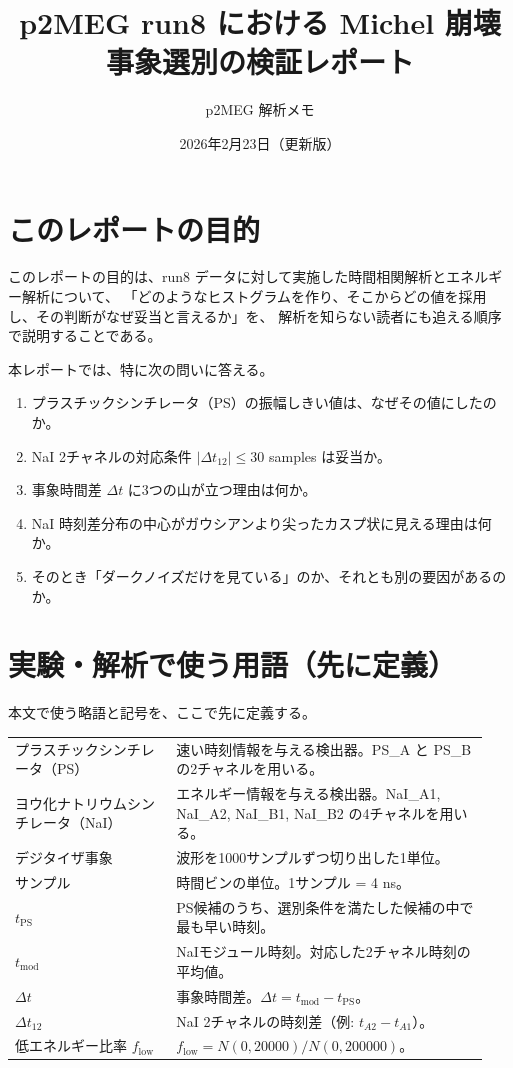 \documentclass[a4paper,11pt]{jsarticle}
\title{p2MEG run8 における Michel 崩壊事象選別の検証レポート}
\author{p2MEG 解析メモ}
\date{2026年2月23日（更新版）}
\begin{document}
\maketitle

\section{このレポートの目的}
このレポートの目的は、run8 データに対して実施した時間相関解析とエネルギー解析について、
「どのようなヒストグラムを作り、そこからどの値を採用し、その判断がなぜ妥当と言えるか」を、
解析を知らない読者にも追える順序で説明することである。

本レポートでは、特に次の問いに答える。
\begin{enumerate}
  \item プラスチックシンチレータ（PS）の振幅しきい値は、なぜその値にしたのか。
  \item NaI 2チャネルの対応条件 $|\Delta t_{12}|\le 30$ samples は妥当か。
  \item 事象時間差 $\Delta t$ に3つの山が立つ理由は何か。
  \item NaI 時刻差分布の中心がガウシアンより尖ったカスプ状に見える理由は何か。
  \item そのとき「ダークノイズだけを見ている」のか、それとも別の要因があるのか。
\end{enumerate}

\section{実験・解析で使う用語（先に定義）}
本文で使う略語と記号を、ここで先に定義する。

\begin{longtable}{p{0.32\linewidth}p{0.62\linewidth}}
プラスチックシンチレータ（PS） & 速い時刻情報を与える検出器。PS\_A と PS\_B の2チャネルを用いる。 \\
ヨウ化ナトリウムシンチレータ（NaI） & エネルギー情報を与える検出器。NaI\_A1, NaI\_A2, NaI\_B1, NaI\_B2 の4チャネルを用いる。 \\
デジタイザ事象 & 波形を1000サンプルずつ切り出した1単位。 \\
サンプル & 時間ビンの単位。1サンプル = 4 ns。 \\
$ t_{\mathrm{PS}} $ & PS候補のうち、選別条件を満たした候補の中で最も早い時刻。 \\
$ t_{\mathrm{mod}} $ & NaIモジュール時刻。対応した2チャネル時刻の平均値。 \\
$ \Delta t $ & 事象時間差。$\Delta t=t_{\mathrm{mod}}-t_{\mathrm{PS}}$。 \\
$ \Delta t_{12} $ & NaI 2チャネルの時刻差（例: $t_{A2}-t_{A1}$）。 \\
低エネルギー比率 $f_{\mathrm{low}}$ & $f_{\mathrm{low}}=N(0,20000)/N(0,200000)$。 \\
\end{longtable}
\end{document}
